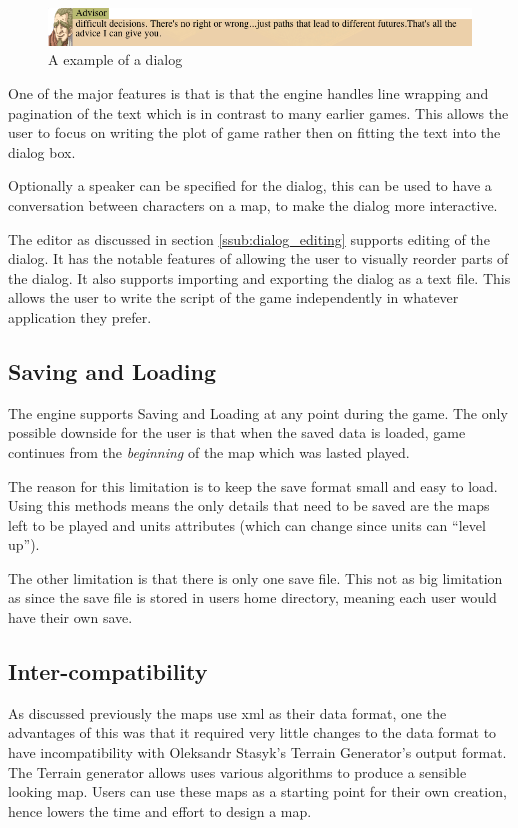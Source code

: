 \begin{figure}[htbp]
	\centering
		\includegraphics[width=6.3in]{figures/dialog2.png}
	\caption{A example of a dialog}
	\label{fig:figures_dialog2}
\end{figure}

One of the major features is that is that the engine handles line wrapping and pagination of the text which is in contrast to many earlier games. This allows the user to focus on writing the plot of game rather then on fitting the text into the dialog box. 

Optionally a speaker can be specified for the dialog, this can be used to have a conversation between characters on a map, to make the dialog more interactive. 

The editor as discussed in section \ref{ssub:dialog_editing} supports editing of the dialog. It has the notable features of allowing the user to visually reorder parts of the dialog. It also supports   importing and exporting the dialog as a text file.  This allows the user to write the script of the game independently in whatever application they prefer. 


\subsection{Saving and Loading}
The engine supports Saving and Loading at any point during the game. The only possible downside  for the user is that when the saved data is loaded, game continues from the \emph{beginning} of the map which was lasted played. 

The reason for this limitation is to keep the save format small and easy to load. Using this methods means the only details that need to be saved are the maps left to be played and units attributes (which can change since units can ``level up''). 

The other limitation is that there is only one save file. This not as big limitation as since the  save file is stored in users home directory, meaning each user would have their own save.

\subsection{Inter-compatibility}
\label{ssub:intercompatibility}
As discussed previously the maps use xml as their data format, one the advantages of this was that it required very little changes to the data format to have incompatibility with Oleksandr Stasyk's  Terrain Generator's output format.  The Terrain generator allows uses various algorithms to produce a sensible looking map. Users can use these maps as a starting point for their own creation, hence lowers the time and effort to design a map.

